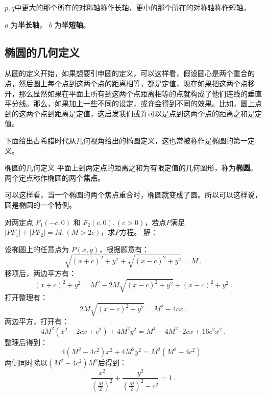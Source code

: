 $p,q$中更大的那个所在的对称轴称作长轴，更小的那个所在的对称轴称作短轴。

$a$ 为\textbf{半长轴}， $b$ 为\textbf{半短轴}。

\subsection{椭圆的几何定义}

从圆的定义开始，如果想要引申圆的定义，可以这样看，假设圆心是两个重合的点，然后圆上每个点到这两个点的距离相等，都是定值，现在如果把这两个点移开，那么显然如果在平面上所有到这两个点距离相等的点就构成了他们连线的垂直平分线。那么，如果加上一些不同的设定，或许会得到不同的效果。比如，圆上点到的这两个点到距离是定值，这启发我们或许可以是点到这两个点的距离之和是定值。

下面给出古希腊时代从几何视角给出的椭圆定义，这也常被称作是椭圆的第一定义。

\begin{definition}{椭圆的几何定义}
平面上到两定点的距离之和为有限定值的几何图形，称为\textbf{椭圆}。两个定点称作椭圆的两个\textbf{焦点}。
\end{definition}

可以这样看，当一个椭圆的两个焦点重合时，椭圆就变成了圆。所以可以这样说，圆是椭圆的一个特例。


\begin{example}{对两定点 $F_1(-c, 0)$ 和 $F_2(c, 0),(c>0)$，若点$P$满足$|PF_1| + |PF_2| = M,(M > 2c)$，求$P$方程。}\label{ex_Elips3_1}
解：

设椭圆上的任意点为 $P(x, y)$，根据题意有：
\begin{equation}
\sqrt{(x + c)^2 + y^2} + \sqrt{(x - c)^2 + y^2} = M~.
\end{equation}
移项后，两边平方有：
\begin{equation}
(x + c)^2 + y^2 = M^2 - 2M\sqrt{(x - c)^2 + y^2} + (x - c)^2 + y^2~.
\end{equation}
打开整理有：
\begin{equation}
2M\sqrt{(x - c)^2 + y^2}= M^2 - 4cx~.
\end{equation}
两边平方，打开有：
\begin{equation}
4M^2(x^2 - 2cx+c^2) + 4M^2y^2= M^4-4M^2\cdot2cx+16c^2x^2~.
\end{equation}
整理后得到：
\begin{equation}
4(M^2 -4c^2)x^2 + 4M^2y^2= M^2(M^2-4c^2)~.
\end{equation}
两侧同时除以$(M^2-4c^2)M^2$后得到：
\begin{equation}
\frac{x^2}{\left(\displaystyle\frac{M}{2}\right)^2} + \frac{y^2}{\displaystyle\left(\frac{M}{2}\right)^2-c^2}=1~.
\end{equation}
\end{example}

